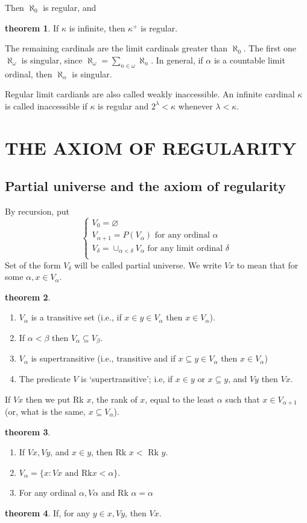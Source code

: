 \documentclass[a4paper,11pt]{article}%
\theoremstyle{remark}
\theoremstyle{definition}
\newtheorem{theorem}{theorem}[section]
\theoremstyle{definition}
\theoremstyle{plain}
\theoremstyle{definition}
\begin{document}
Then $\aleph_0$ is regular, and 
\begin{theorem}
    If $\kappa$ is infinite, then $\kappa^+$ is regular.
\end{theorem}
The remaining cardinals are the limit cardinals greater than $\aleph_0$.
The first one $\aleph_{\omega}$ is singular, since $\aleph_{\omega}=\sum_{n\in\omega}\aleph_n$.
In general, if $\alpha$ is a countable limit ordinal, then $\aleph_{\alpha}$ is singular.

Regular limit cardianls are also called weakly inaccessible. An infinite 
cardinal $\kappa$ is called inaccessible if $\kappa$ is regular and $2^{\lambda}<\kappa$
whenever $\lambda<\kappa.$
\section{THE AXIOM OF REGULARITY}
\subsection{Partial universe and the axiom of regularity}
By recursion, put
\[ 
\begin{cases}
    V_0=\varnothing\\
    V_{\alpha+1}=P(V_{\alpha})\text{ for any ordinal }\alpha\\
    V_{\delta}=\cup_{\alpha<\delta}V_{\alpha} \text{ for any limit ordinal }\delta\\
\end{cases}
\]
Set of the form $V_{\delta}$ will be called partial universe.
We write $Vx$ to mean that for some $\alpha,x\in V_{\alpha}$.
\begin{theorem}
    \begin{enumerate}
        \item $V_{\alpha}$ is a transitive set (i.e., if $x\in y\in V_{\alpha}$ then $x\in V_{\alpha}$).
        \item If $\alpha<\beta$ then $V_{\alpha}\subseteq V_{\beta}$.
        \item $V_{\alpha}$ is supertransitive (i.e., transitive and if $x\subseteq y\in V_{\alpha}$ then $x\in V_{\alpha}$)
        \item The predicate $V$ is `supertransitive'; i.e, if $x\in y$ or $x\subseteq y$, and $Vy$ then $Vx$.
    \end{enumerate}
\end{theorem}
If $Vx$ then we put Rk $x$, the rank of $x$, equal to the least $\alpha$
such that $x\in V_{\alpha+1}$(or, what is the same, $x\subseteq V_{\alpha}$).
\begin{theorem}
    \begin{enumerate}
        \item If $Vx,Vy$, and $x\in y$, then Rk $x<$ Rk $y$.
        \item $V_{\alpha}=\{x:Vx \text{ and Rk}x<\alpha \}$.
        \item  For any ordinal $\alpha,V\alpha$ and Rk $\alpha=\alpha$
    \end{enumerate}
\end{theorem}
\begin{theorem}
    If, for any $y\in x,Vy$, then $Vx$.
\end{theorem}
\end{document}
